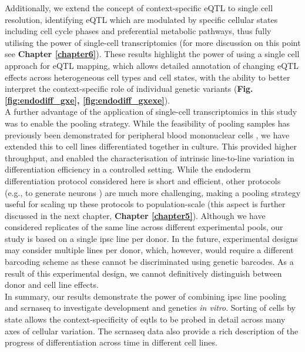 Additionally, we extend the concept of context-specific eQTL \cite{fairfax2012genetics, fairfax2014innate, knowles2017allele} to single cell resolution, identifying eQTL which are modulated by specific cellular states including cell cycle phases and preferential metabolic pathways, thus fully utilising the power of single-cell transcriptomics (for more discussion on this point see \textbf{Chapter 
\ref{chapter6}}).
These results highlight the power of using a single cell approach for eQTL mapping, which allows detailed annotation of changing eQTL effects across heterogeneous cell types and cell states, with the ability to better interpret the context-specific role of individual genetic variants (\textbf{Fig. \ref{fig:endodiff_gxe}, \ref{fig:endodiff_gxexe}}). \\

A further advantage of the application of single-cell transcriptomics in this study was to enable the pooling strategy. 
While the feasibility of pooling samples has previously been demonstrated for peripheral blood mononuclear cells \cite{kang2018multiplexed}, we have extended this to cell lines differentiated together in culture. 
This provided higher throughput, and enabled the characterisation of intrinsic line-to-line variation in differentiation efficiency in a controlled setting. 
While the endoderm differentiation protocol considered here is short and efficient, other protocols (e.g., to generate neurons \cite{tao2016neural}) are much more challenging, making a pooling strategy useful for scaling up these protocols to population-scale (this aspect is further discussed in the next chapter, \textbf{Chapter 
\ref{chapter5}}).
Although we have considered replicates of the same line across different experimental pools, our study is based on a single \gls{ipsc} line per donor. 
In the future, experimental designs may consider multiple lines per donor, which, however, would require a different barcoding scheme as these cannot be discriminated
using genetic barcodes. 
As a result of this experimental design, we cannot definitively distinguish between donor and cell line effects.\\

In summary, our results demonstrate the power of combining \gls{ipsc} line pooling and \gls{scrnaseq} to investigate development and genetics \textit{in vitro}. 
Sorting of cells by state allows the context-specificity of \glspl{eqtl} to be probed in detail across many axes of cellular variation. 
The \gls{scrnaseq} data also provide a rich description of the progress of differentiation across time in different cell lines. \\

